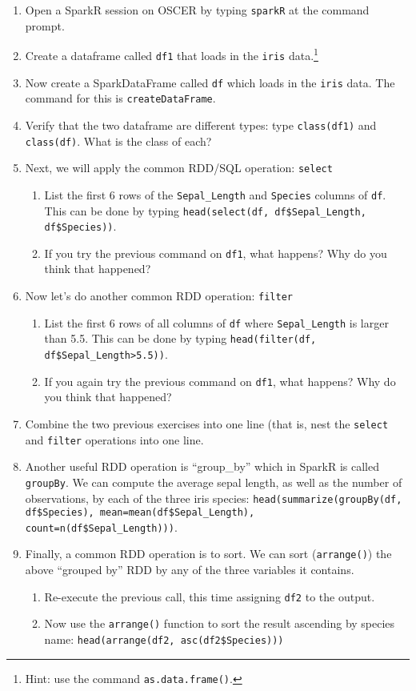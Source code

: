 \documentclass[12pt,english]{exam}
\begin{document}
\begin{questions}
\begin{enumerate}
    \item Open a SparkR session on OSCER by typing \texttt{sparkR} at the command prompt.
    \item Create a dataframe called \texttt{df1} that loads in the \texttt{iris} data.\footnote{Hint: use the command \texttt{as.data.frame()}.}
    \item Now create a SparkDataFrame called \texttt{df} which loads in the \texttt{iris} data. The command for this is \texttt{createDataFrame}.
    \item Verify that the two dataframe are different types: type \texttt{class(df1)} and \texttt{class(df)}. What is the class of each?
    \item Next, we will apply the common RDD/SQL operation: \texttt{select}
    \begin{enumerate}
    \item List the first 6 rows of the \texttt{Sepal\_Length} and \texttt{Species} columns of \texttt{df}. This can be done by typing \texttt{head(select(df, df\$Sepal\_Length, df\$Species))}.
    \item If you try the previous command on \texttt{df1}, what happens? Why do you think that happened?
    \end{enumerate}
    \item Now let's do another common RDD operation: \texttt{filter} 
    \begin{enumerate}
    \item List the first 6 rows of all columns of \texttt{df} where \texttt{Sepal\_Length} is larger than 5.5. This can be done by typing \texttt{head(filter(df, df\$Sepal\_Length>5.5))}.
    \item If you again try the previous command on \texttt{df1}, what happens? Why do you think that happened?
    \end{enumerate}
    \item Combine the two previous exercises into one line (that is, nest the \texttt{select} and \texttt{filter} operations into one line.
    \item Another useful RDD operation is ``group\_by'' which in SparkR is called \texttt{groupBy}. We can compute the average sepal length, as well as the number of observations, by each of the three iris species: \texttt{head(summarize(groupBy(df, df\$Species), mean=mean(df\$Sepal\_Length), count=n(df\$Sepal\_Length)))}.
    \item Finally, a common RDD operation is to sort. We can sort (\texttt{arrange()}) the above ``grouped by'' RDD by any of the three variables it contains.
    \begin{enumerate}
    \item Re-execute the previous call, this time assigning \texttt{df2} to the output.
    \item Now use the \texttt{arrange()} function to sort the result ascending by species name: \texttt{head(arrange(df2, asc(df2\$Species)))}
    \end{enumerate}
\end{enumerate}


\end{questions}
\end{document}
